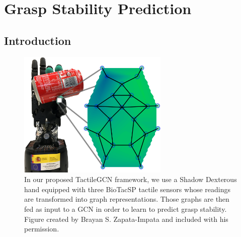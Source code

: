 \chapter{Grasp Stability Prediction}
\label{cha:tactile}

\begin{chapterabstract}
    \lipsum[2]
\end{chapterabstract}

\minitoc

\clearpage

\section{Introduction}
\label{cha:tactile:sec:introduction}

\begin{figure}[!b]
	\centering
	\includegraphics[width = 0.64\textwidth, clip = false, trim = 0 0 0 0]{Figures/Tactile/hand-coke.png}
	\caption{In our proposed TactileGCN framework, we use a Shadow Dexterous hand equipped with three BioTacSP tactile sensors whose readings are transformed into graph representations. Those graphs are then fed as input to a \ac{GCN} in order to learn to predict grasp stability. Figure created by Brayan S. Zapata-Impata and included with his permission.}
	\label{fig:shadow-coke}
\end{figure}

